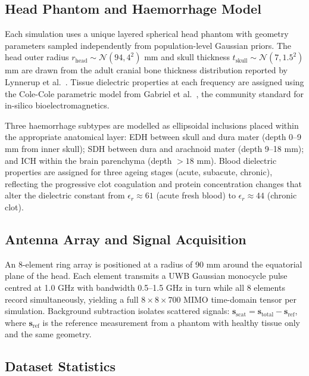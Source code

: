 \documentclass[journal]{IEEEtran}
\begin{document}
\subsection{Head Phantom and Haemorrhage Model}

Each simulation uses a unique layered spherical head phantom
with geometry parameters sampled independently from
population-level Gaussian priors.  The head outer radius
$r_\text{head} \sim \mathcal{N}(94, 4^2)$ mm and skull
thickness $t_\text{skull} \sim \mathcal{N}(7, 1.5^2)$ mm
are drawn from the adult cranial bone thickness distribution
reported by Lynnerup et al.\ \cite{Lynnerup2005}.  Tissue
dielectric properties at each frequency are assigned using
the Cole-Cole parametric model from Gabriel et al.\
\cite{Gabriel1996}, the community standard for in-silico
bioelectromagnetics.

Three haemorrhage subtypes are modelled as ellipsoidal
inclusions placed within the appropriate anatomical layer:
EDH between skull and dura mater (depth 0--9 mm from inner
skull); SDH between dura and arachnoid mater (depth 9--18 mm);
and ICH within the brain parenchyma (depth $>18$ mm).
Blood dielectric properties are assigned for three ageing
stages (acute, subacute, chronic), reflecting the progressive
clot coagulation and protein concentration changes that alter
the dielectric constant from $\epsilon_r \approx 61$
(acute fresh blood) to $\epsilon_r \approx 44$ (chronic clot).

\subsection{Antenna Array and Signal Acquisition}

An 8-element ring array is positioned at a radius of 90 mm
around the equatorial plane of the head.  Each element
transmits a UWB Gaussian monocycle pulse centred at 1.0 GHz
with bandwidth 0.5--1.5 GHz in turn while all 8 elements
record simultaneously, yielding a full
$8 \times 8 \times 700$ MIMO time-domain tensor per simulation.
Background subtraction isolates scattered signals:
$\mathbf{s}_\text{scat} = \mathbf{s}_\text{total} -
\mathbf{s}_\text{ref}$,
where $\mathbf{s}_\text{ref}$ is the reference measurement
from a phantom with healthy tissue only and the same geometry.

\subsection{Dataset Statistics}
\end{document}
